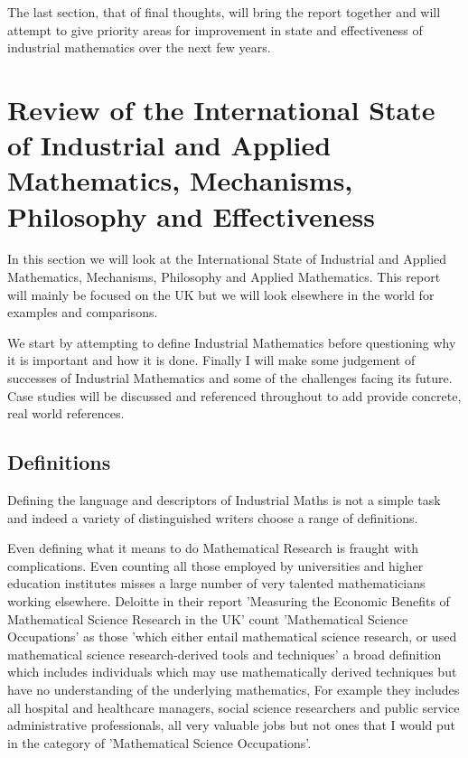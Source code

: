 \documentclass[11pt]{article} %
\begin{document}
	The last section, that of final thoughts, will bring the report together and will attempt to give priority areas for improvement in state and effectiveness of industrial mathematics over the next few years. 
	
	\pagebreak
	\section{Review of the International State of Industrial and Applied Mathematics, Mechanisms, Philosophy and Effectiveness}
	
	In this section we will look at the International State of Industrial and Applied Mathematics, Mechanisms, Philosophy and Applied Mathematics. This report will mainly be  focused on the UK but we will look elsewhere in the world for examples and comparisons. 
	
	We start by attempting to define Industrial Mathematics before questioning why it is important  and how it is done. Finally I will make some judgement of successes of Industrial Mathematics  and some of the challenges facing its future. Case studies will be discussed and referenced throughout to add provide concrete, real world references. 
	
	\subsection{Definitions \label{definitions} }
	
	Defining the language and descriptors of  Industrial Maths is not a simple task and indeed a variety of distinguished writers choose a range of definitions. 
	
	Even defining what it means to do Mathematical Research is fraught with complications. Even counting all those employed by universities and higher education institutes misses a large number of very talented mathematicians working elsewhere. 	Deloitte in their report 'Measuring the Economic Benefits of Mathematical Science Research in the UK' \cite{deloitteuk} count 'Mathematical Science Occupations' as those 'which either entail mathematical science research, or used mathematical science research-derived tools and techniques' a broad definition which includes individuals which may use mathematically derived techniques but have no understanding of the underlying mathematics, For example they includes all hospital and healthcare managers, social science researchers and public service administrative professionals, all very valuable jobs but not ones that I would put in the category of 'Mathematical Science Occupations'. 
	
\end{document}
